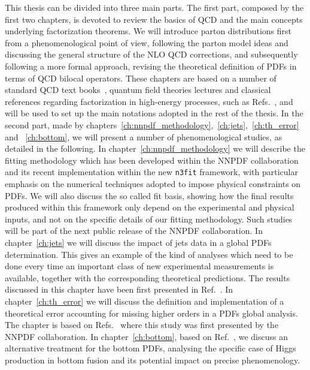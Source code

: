 This thesis can be divided into three main parts. The first part, composed by the first two chapters, 
is devoted to review the basics of QCD and the main concepts underlying factorization theorems. 
We will introduce parton distributions first from a phenomenological point of view, following the parton model ideas and
discussing the general structure of the NLO QCD corrections, and subsequently following a more formal approach,
revising the theoretical definition of PDFs in terms of QCD bilocal operators.
These chapters are based on a number of standard QCD text books~\cite{Ellis:1991qj,Muta:2010xua,Collins:1984xc},
quantum field theories lectures and classical references regarding factorization in high-energy processes,
such as Refs.~\cite{Collins:1980ui, Collins:1981uw, Collins:1989gx}, and will be used to set up the 
main notations adopted in the rest of the thesis.
%
In the second part, made by chapters~\ref{ch:nnpdf_methodology},~\ref{ch:jets},~\ref{ch:th_error} and ~\ref{ch:bottom}, 
we will present a number of phenomenological studies, as detailed in the following.
%
In chapter~\ref{ch:nnpdf_methodology} we will describe the fitting methodology which has been developed
within the NNPDF collaboration and its recent implementation within the new {\tt n3fit} framework, 
with particular emphasis on the numerical techniques adopted to impose physical constraints on PDFs.
We will also discuss the so called fit basis, showing how
the final results produced within this framework only depend on the experimental and physical inputs, 
and not on the specific details of our fitting methodology. Such studies will be part of the next public release
of the NNPDF collaboration.
%
In chapter~\ref{ch:jets} we will discuss the impact of jets data in a global PDFs determination. 
This gives an example of the kind of analyses which need to be done
every time an important class of new experimental measurements is available, together with the corresponding
theoretical predictions. 
The results discussed in this chapter have been first presented in Ref.~\cite{AbdulKhalek:2020jut}.
In chapter~\ref{ch:th_error} we will discuss the definition and implementation of a theoretical error 
accounting for missing higher orders in a PDFs global analysis. 
The chapter is based on Refs.~\cite{AbdulKhalek:2019bux,AbdulKhalek:2019ihb} where this
study was first presented by the NNPDF collaboration.
In chapter~\ref{ch:bottom}, based on Ref.~\cite{Forte:2019hjc}, we discuss an alternative treatment for the bottom PDFs,
analysing the specific case of Higgs production in bottom fusion and its potential impact on precise phenomenology. 

